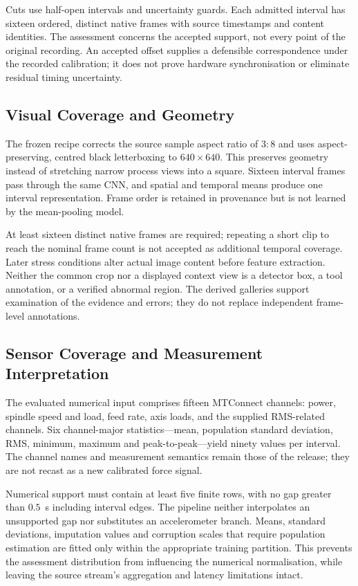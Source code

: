 Cuts use half-open intervals and uncertainty guards. Each admitted interval has sixteen
ordered, distinct native frames with source timestamps and content identities. The
assessment concerns the accepted support, not every point of the original recording. An
accepted offset supplies a defensible correspondence under the recorded calibration; it
does not prove hardware synchronisation or eliminate residual timing uncertainty.

\subsection{Visual Coverage and Geometry}
The frozen recipe corrects the source sample aspect ratio of $3{:}8$ and uses
aspect-preserving, centred black letterboxing to $640\times640$. This preserves
geometry instead of stretching narrow process views into a square. Sixteen interval
frames pass through the same CNN, and spatial and temporal means produce one interval
representation. Frame order is retained in provenance but is not learned by the
mean-pooling model.

At least sixteen distinct native frames are required; repeating a short clip to reach
the nominal frame count is not accepted as additional temporal coverage. Later stress
conditions alter actual image content before feature extraction. Neither the common crop
nor a displayed context view is a detector box, a tool annotation, or a verified
abnormal region. The derived galleries support examination of the evidence and errors;
they do not replace independent frame-level annotations.

\subsection{Sensor Coverage and Measurement Interpretation}
The evaluated numerical input comprises fifteen MTConnect channels: power, spindle speed
and load, feed rate, axis loads, and the supplied RMS-related channels. Six
channel-major statistics---mean, population standard deviation, RMS, minimum, maximum
and peak-to-peak---yield ninety values per interval. The channel names and measurement
semantics remain those of the release; they are not recast as a new calibrated force
signal.

Numerical support must contain at least five finite rows, with no gap greater than
$0.5$~s including interval edges. The pipeline neither interpolates an unsupported gap
nor substitutes an accelerometer branch. Means, standard deviations, imputation values
and corruption scales that require population estimation are fitted only within the
appropriate training partition. This prevents the assessment distribution from
influencing the numerical normalisation, while leaving the source stream's aggregation
and latency limitations intact.

